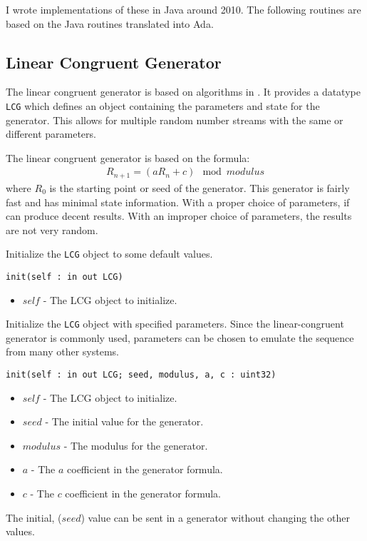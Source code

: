 \documentclass[10pt, openany]{book}
\newcommand{\function}[1]{\texttt{#1}}
\newcommand{\datatype}[1]{\texttt{#1}}
\begin{document}
I wrote implementations of these in Java around 2010.  The following routines are based on the Java routines translated into Ada.

\subsection{Linear Congruent Generator}
The linear congruent generator is based on algorithms in \cite{NR-C}.  It provides a datatype \datatype{LCG} which defines an object containing the parameters and state for the generator.  This allows for multiple random number streams with the same or different parameters.

The linear congruent generator is based on the formula:
\begin{align*}
  R_{n+1} = (aR_n + c) \mod modulus
\end{align*}
where $R_0$ is the starting point or seed of the generator.  This generator is fairly fast and has minimal state information.  With a proper choice of parameters, if can produce decent results.  With an improper choice of parameters, the results are not very random.

Initialize the \datatype{LCG} object to some default values.

\function{init(self : in out LCG)}
\begin{itemize}
  \item $self$ - The LCG object to initialize.
\end{itemize}

Initialize the \datatype{LCG} object with specified parameters.  Since the linear-congruent generator is commonly used, parameters can be chosen to emulate the sequence from many other systems.

\function{init(self : in out LCG; seed, modulus, a, c : uint32)}
\begin{itemize}
  \item $self$ - The LCG object to initialize.
  \item $seed$ - The initial value for the generator.
  \item $modulus$ - The modulus for the generator.
  \item $a$ - The $a$ coefficient in the generator formula.
  \item $c$ - The $c$ coefficient in the generator formula.
\end{itemize}

The initial, ($seed$) value can be sent in a generator without changing the other values.
\end{document}
